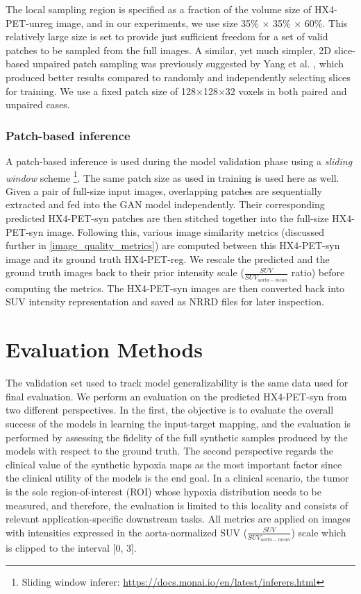 The local sampling region is specified as a fraction of the volume size of HX4-PET-unreg image, and in our experiments, we use size 35\% $\times$ 35\% $\times$ 60\%. This relatively large size is set to provide just sufficient freedom for a set of valid patches to be sampled from the full images. A similar, yet much simpler, 2D slice-based unpaired patch sampling was previously suggested by Yang et al. \cite{yang2018unpaired}, which produced better results compared to randomly and independently selecting slices for training. We use a fixed patch size of 128$\times$128$\times$32 voxels in both paired and unpaired cases.


\subsubsection{Patch-based inference}
A patch-based inference is used during the model validation phase using a \textit{sliding window} scheme \footnote{Sliding window inferer: \url{https://docs.monai.io/en/latest/inferers.html}}. The same patch size as used in training is used here as well. Given a pair of full-size input images, overlapping patches are sequentially extracted and fed into the GAN model independently. Their corresponding predicted HX4-PET-syn patches are then stitched together into the full-size HX4-PET-syn image. Following this, various image similarity metrics (discussed further in \ref{image_quality_metrics}) are computed between this HX4-PET-syn image and its ground truth HX4-PET-reg. We rescale the predicted and the ground truth images back to their prior intensity scale ($\frac{SUV}{SUV_{aorta-mean}}$ ratio) before computing the metrics. The HX4-PET-syn images are then converted back into SUV intensity representation and saved as NRRD files for later inspection.



\section{Evaluation Methods}
\label{Evaluation_Methods}
The validation set used to track model generalizability is the same data used for final evaluation. We perform an evaluation on the predicted HX4-PET-syn from two different perspectives. In the first, the objective is to evaluate the overall success of the models in learning the input-target mapping, and the evaluation is performed by assessing the fidelity of the full synthetic samples produced by the models with respect to the ground truth. The second perspective regards the clinical value of the synthetic hypoxia maps as the most important factor since the clinical utility of the models is the end goal. In a clinical scenario, the tumor is the sole region-of-interest (ROI) whose hypoxia distribution needs to be measured, and therefore, the evaluation is limited to this locality and consists of relevant application-specific downstream tasks. All metrics are applied on images with intensities expressed in the aorta-normalized SUV ($\frac{SUV}{SUV_{aorta-mean}}$) scale which is clipped to the interval [0, 3]. 


